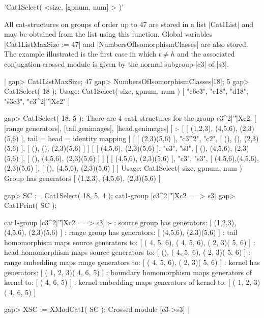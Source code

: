 %

'Cat1Select( <size, [gpnum, num] > )'

All cat-structures  on groups of  order up to 47 are  stored in a list
|Cat1List| and   may be obtained  from the  list  using this function.
Global        variables    |Cat1ListMaxSize      :=    47|         and
|NumbersOfIsomorphismClasses|   are  also    stored.   The     example
illustrated is  the first case  in which $t \ne  h$ and the associated
conjugation  crossed module is  given  by the  normal subgroup |c3| of
|s3|.
 
|    gap> Cat1ListMaxSize;
    47
    gap> NumbersOfIsomorphismClasses[18];
    5
    gap> Cat1Select( 18 );
    Usage:  Cat1Select( size, gpnum, num )
    [ "c6c3", "c18", "d18", "s3c3", "c3^2|'\|'|Xc2" ]

    gap> Cat1Select( 18, 5 );
    There are 4 cat1-structures for the group c3^2|'\|'|Xc2.
    [ [range generators], [tail.genimages], [head.genimages] ]  :- 
    [ [ (1,2,3), (4,5,6), (2,3)(5,6) ],  tail = head = identity mapping ]
    [ [ (2,3)(5,6) ], "c3^2", "c2", [ (), (), (2,3)(5,6) ],
        [ (), (), (2,3)(5,6) ] ]
    [ [ (4,5,6), (2,3)(5,6) ], "c3", "s3", [ (), (4,5,6), (2,3)(5,6) ], 
        [ (), (4,5,6), (2,3)(5,6) ] ]
    [ [ (4,5,6), (2,3)(5,6) ], "c3", "s3", [ (4,5,6),(4,5,6),(2,3)(5,6) ],
        [ (), (4,5,6), (2,3)(5,6) ] ]
    Usage:  Cat1Select( size, gpnum, num )
    Group has generators [ (1,2,3), (4,5,6), (2,3)(5,6) ]
 
    gap> SC := Cat1Select( 18, 5, 4 );
    cat1-group [c3^2|'\|'|Xc2 ==> s3] 
    gap> Cat1Print( SC );

    cat1-group [c3^2|'\|'|Xc2 ==> s3] :- 
    : source group has generators:
      [ (1,2,3), (4,5,6), (2,3)(5,6) ]
    :  range group has generators:
      [ (4,5,6), (2,3)(5,6) ]
    : tail homomorphism maps source generators to:
      [ ( 4, 5, 6), ( 4, 5, 6), ( 2, 3)( 5, 6) ]
    : head homomorphism maps source generators to:
      [ (), ( 4, 5, 6), ( 2, 3)( 5, 6) ]
    : range embedding maps range generators to:
      [ ( 4, 5, 6), ( 2, 3)( 5, 6) ]
    : kernel has generators:
      [ ( 1, 2, 3)( 4, 6, 5) ]
    : boundary homomorphism maps generators of kernel to:
      [ ( 4, 6, 5) ]
    : kernel embedding maps generators of kernel to:
      [ ( 1, 2, 3)( 4, 6, 5) ]

    gap> XSC := XModCat1( SC );
    Crossed module [c3->s3]   |

